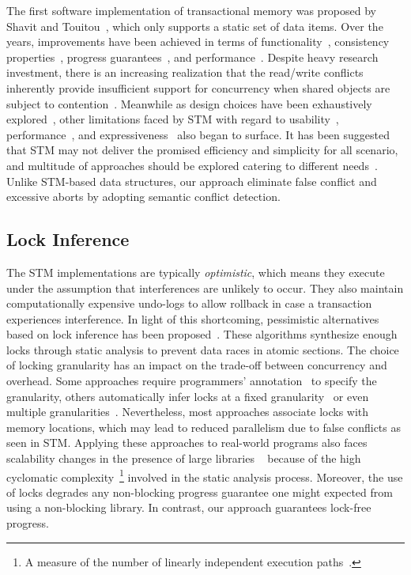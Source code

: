 \documentclass[10pt,conference,compsocconf]{IEEEtran}
\begin{document}
The first software implementation of transactional memory was proposed by Shavit and Touitou~\cite{shavit1997software}, which only supports a static set of data items.
Over the years, improvements have been achieved in terms of functionality~\cite{herlihy2003software}, consistency properties~\cite{guerraoui2008correctness}, progress guarantees~\cite{marathe2006lowering}, and performance~\cite{saha2006mcrt,dice2006transactional}. 
Despite heavy research investment, there is an increasing realization that the read/write conflicts inherently provide insufficient support for concurrency when shared objects are subject to contention~\cite{koskinen2010coarse}.
Meanwhile as design choices have been exhaustively explored~\cite{marathe2004qualitative,marathe2004design}, other limitations faced by STM with regard to usability~\cite{Rossbach2010transactional}, performance~\cite{cascaval2008software}, and expressiveness~\cite{guerraoui2008obstruction} also began to surface.
It has been suggested that STM may not deliver the promised efficiency and simplicity for all scenario, and multitude of approaches should be explored catering to different needs~\cite{attiya2010inherent}.
Unlike STM-based data structures, our approach eliminate false conflict and excessive aborts by adopting semantic conflict detection.

\subsection{Lock Inference}
The STM implementations are typically \emph{optimistic}, which means they execute under the assumption that interferences are unlikely to occur.
They also maintain computationally expensive undo-logs to allow rollback in case a transaction experiences interference.
In light of this shortcoming, pessimistic alternatives based on lock inference has been proposed~\cite{mccloskey2006autolocker}.
These algorithms synthesize enough locks through static analysis to prevent data races in atomic sections.
The choice of locking granularity has an impact on the trade-off between concurrency and overhead.
Some approaches require programmers' annotation~\cite{golan2013concurrent} to specify the granularity, others automatically infer locks at a fixed granularity~\cite{emmi2007lock} or even multiple granularities~\cite{cherem2008inferring}.
Nevertheless, most approaches associate locks with memory locations, which may lead to reduced parallelism due to false conflicts as seen in STM. 
Applying these approaches to real-world programs also faces scalability changes in the presence of large libraries ~\cite{gudka2012lock} because of the high cyclomatic complexity~\footnote{A measure of the number of linearly independent execution paths~\cite{mccabe1976complexity}.} involved in the static analysis process.
Moreover, the use of locks degrades any non-blocking progress guarantee one might expected from using a non-blocking library.
In contrast, our approach guarantees lock-free progress.
\end{document}
